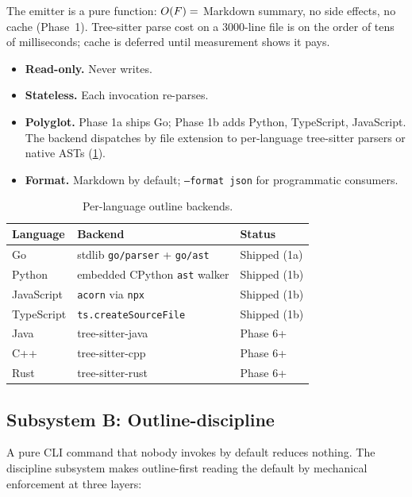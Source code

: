 The emitter is a pure function: $O(F) =$ Markdown
summary, no side effects, no cache (Phase~1). Tree-sitter parse cost
on a 3000-line file is on the order of tens of milliseconds; cache is
deferred until measurement shows it pays.

\begin{itemize}[leftmargin=*]
  \item \textbf{Read-only.} Never writes.
  \item \textbf{Stateless.} Each invocation re-parses.
  \item \textbf{Polyglot.} Phase 1a ships Go; Phase 1b adds Python,
        TypeScript, JavaScript. The backend dispatches by file
        extension to per-language tree-sitter parsers or native
        ASTs (\cref{tab:backends}).
  \item \textbf{Format.} Markdown by default; \texttt{--format json}
        for programmatic consumers.
\end{itemize}

\begin{table}[ht]
\centering
\caption{Per-language outline backends.}
\label{tab:backends}
\small
\begin{tabular}{lll}
\toprule
\textbf{Language} & \textbf{Backend} & \textbf{Status} \\
\midrule
Go         & stdlib \texttt{go/parser} + \texttt{go/ast} & Shipped (1a) \\
Python     & embedded CPython \texttt{ast} walker        & Shipped (1b) \\
JavaScript & \texttt{acorn} via \texttt{npx}             & Shipped (1b) \\
TypeScript & \texttt{ts.createSourceFile}                & Shipped (1b) \\
Java       & tree-sitter-java                            & Phase 6+ \\
C++        & tree-sitter-cpp                             & Phase 6+ \\
Rust       & tree-sitter-rust                            & Phase 6+ \\
\bottomrule
\end{tabular}
\end{table}

\subsection{Subsystem B: Outline-discipline}
\label{sec:system:discipline}

A pure CLI command that nobody invokes by default reduces nothing. The
discipline subsystem makes outline-first reading the default by
mechanical enforcement at three layers:

